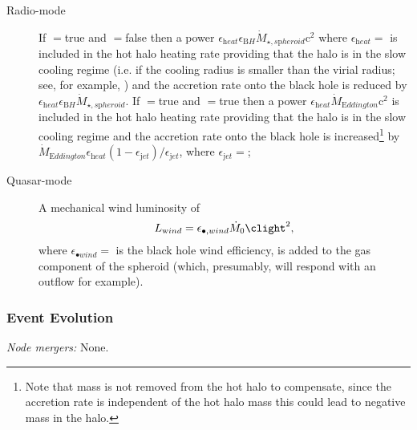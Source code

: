 \begin{description}
 \item [Radio-mode] If {\normalfont \ttfamily [blackHoleHeatsHotHalo]}$=${\normalfont \ttfamily true} and {\normalfont \ttfamily [blackHoleAccretesFromHotHalo]}$=${\normalfont \ttfamily false} then a power $\epsilon_{\mathrm heat} \epsilon_{\mathrm BH} \dot{M}_{\star,s{\mathrm pheroid}} {\mathrm c}^2$ where $\epsilon_{\mathrm heat}=${\normalfont \ttfamily [blackHoleHeatingEfficiency]} is included in the hot halo heating rate providing that the halo is in the slow cooling regime (i.e. if the cooling radius is smaller than the virial radius; see, for example, \citealt{benson_cold_2010}) and the accretion rate onto the black hole is reduced by $\epsilon_{\mathrm heat} \epsilon_{\mathrm BH} \dot{M}_{\star,s{\mathrm pheroid}}$. If {\normalfont \ttfamily [blackHoleHeatsHotHalo]}$=${\normalfont \ttfamily true} and {\normalfont \ttfamily [blackHoleAccretesFromHotHalo]}$=${\normalfont \ttfamily true} then a power $\epsilon_{\mathrm heat} \dot{M}_{\mathrm Eddington} {\mathrm c}^2$ is included in the hot halo heating rate providing that the halo is in the slow cooling regime and the accretion rate onto the black hole is increased\footnote{Note that mass is not removed from the hot halo to compensate, since the accretion rate is independent of the hot halo mass this could lead to negative mass in the halo.} by $\dot{M}_{\mathrm Eddington} \epsilon_{\mathrm heat} (1-\epsilon_{\mathrm jet})/\epsilon_{\mathrm jet}$, where $\epsilon_{\mathrm jet}=${\normalfont \ttfamily [blackHoleJetEfficiency]};
 \item [Quasar-mode] A mechanical wind luminosity of \citep{ostriker_momentum_2010}
\begin{equation}
 L_{\mathrm wind} = \epsilon_{\bullet, wind} \dot{M}_0 \clight^2,
\end{equation}
where $\epsilon_{\bullet wind}=${\normalfont \ttfamily [blackHoleWindEfficiency]} is the black hole wind efficiency, is added to the gas \gls{component} of the spheroid (which, presumably, will respond with an outflow for example).
\end{description}

\subsubsection{Event Evolution}

\noindent\emph{Node mergers:} None.\\

